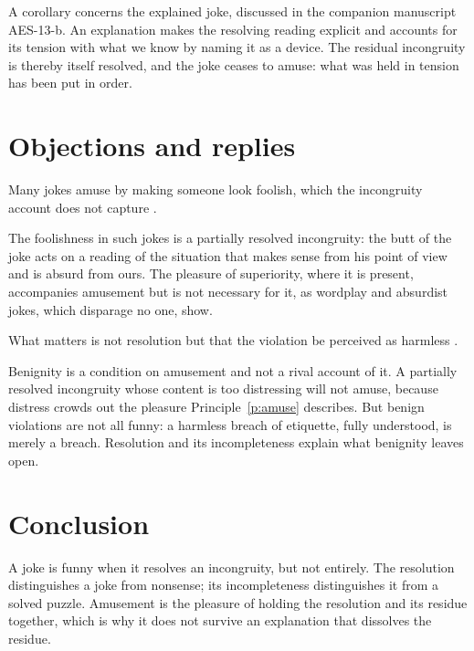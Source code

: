 \documentclass{situationist-preprint}
\begin{document}
A corollary concerns the explained joke, discussed in the companion manuscript AES-13-b. An explanation makes the resolving reading explicit and accounts for its tension with what we know by naming it as a device. The residual incongruity is thereby itself resolved, and the joke ceases to amuse: what was held in tension has been put in order.

\section{Objections and replies}

\begin{objection}[Superiority]\label{o:sup}
Many jokes amuse by making someone look foolish, which the incongruity account does not capture \citep{Hobbes1651}.
\end{objection}

\begin{reply}
The foolishness in such jokes is a partially resolved incongruity: the butt of the joke acts on a reading of the situation that makes sense from his point of view and is absurd from ours. The pleasure of superiority, where it is present, accompanies amusement but is not necessary for it, as wordplay and absurdist jokes, which disparage no one, show.
\end{reply}

\begin{objection}\label{o:bv}
What matters is not resolution but that the violation be perceived as harmless \citep{McGrawWarren2010}.
\end{objection}

\begin{reply}
Benignity is a condition on amusement and not a rival account of it. A partially resolved incongruity whose content is too distressing will not amuse, because distress crowds out the pleasure Principle~\ref{p:amuse} describes. But benign violations are not all funny: a harmless breach of etiquette, fully understood, is merely a breach. Resolution and its incompleteness explain what benignity leaves open.
\end{reply}

\section{Conclusion}

A joke is funny when it resolves an incongruity, but not entirely. The resolution distinguishes a joke from nonsense; its incompleteness distinguishes it from a solved puzzle. Amusement is the pleasure of holding the resolution and its residue together, which is why it does not survive an explanation that dissolves the residue.
\end{document}
